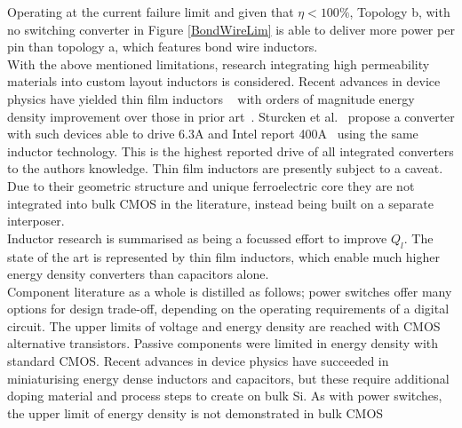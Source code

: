 \documentclass[letterpaper,twocolumn,10pt]{article}
\begin{document}
Operating at the current failure limit and given that $\eta < 100 \%$, Topology b, with no switching converter in Figure \ref{BondWireLim} is able to deliver more power per pin than topology a, which features bond wire inductors.\\
\indent With the above mentioned limitations, research integrating high permeability materials into custom layout inductors is considered. Recent advances in device physics have yielded thin film inductors ~\cite{OSulivan2013} with orders of magnitude energy density improvement over those in prior art~\cite{Meere2009}. Sturcken et al.~\cite{Sturcken2013} propose a converter with such devices able to drive 6.3A and Intel report 400A~\cite{Intel2010} using the same inductor technology. This is the highest reported drive of all integrated converters to the authors knowledge. Thin film inductors are presently subject to a caveat. Due to their geometric structure and unique ferroelectric core they are not integrated into bulk CMOS in the literature, instead being built on a separate interposer.\\
\indent Inductor research is summarised as being a focussed effort to improve $Q_l$. The state of the art is represented by thin film inductors, which enable much higher energy density converters than capacitors alone.\\


\indent Component literature as a whole is distilled as follows; power switches offer many options for design trade-off, depending on the operating requirements of a digital circuit. The upper limits of voltage and energy density are reached with CMOS alternative transistors. Passive components were limited in energy density with standard CMOS. Recent advances in device physics have succeeded in miniaturising energy dense inductors and capacitors, but these require additional doping material and process steps to create on bulk Si. As with power switches, the upper limit of energy density is not demonstrated in bulk CMOS\\
\end{document}
